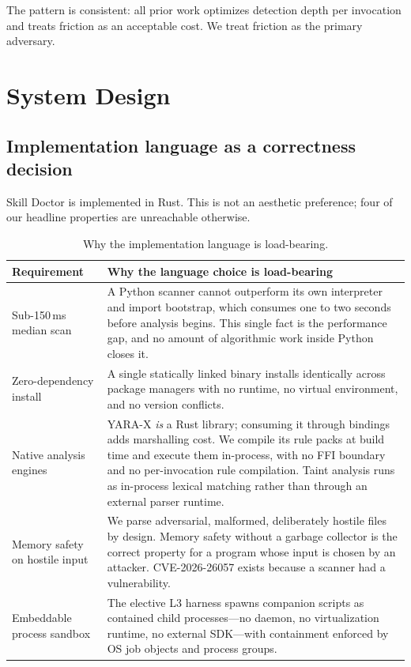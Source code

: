 \documentclass[11pt]{article}
\begin{document}
The pattern is consistent: all prior work optimizes detection depth per
invocation and treats friction as an acceptable cost. We treat friction as the
primary adversary.

\section{System Design}
\label{sec:design}

\subsection{Implementation language as a correctness decision}
\label{sec:rust}

Skill Doctor is implemented in Rust. This is not an aesthetic preference; four
of our headline properties are unreachable otherwise.

\begin{table}[htbp]
  \centering
  \caption{Why the implementation language is load-bearing.}
  \label{tab:rust}
  \small
  \begin{tabularx}{\textwidth}{p{}X}
    \toprule
    Requirement & Why the language choice is load-bearing \\
    \midrule
    Sub-150\,ms median scan &
    A Python scanner cannot outperform its own interpreter and import
    bootstrap, which consumes one to two seconds before analysis begins. This
    single fact is the performance gap, and no amount of algorithmic work
    inside Python closes it. \\
    Zero-dependency install &
    A single statically linked binary installs identically across package
    managers with no runtime, no virtual environment, and no version
    conflicts. \\
    Native analysis engines &
    YARA-X \emph{is} a Rust library; consuming it through bindings adds
    marshalling cost. We compile its rule packs at build time and execute them
    in-process, with no FFI boundary and no per-invocation rule compilation.
    Taint analysis runs as in-process lexical matching rather than through an
    external parser runtime. \\
    Memory safety on hostile input &
    We parse adversarial, malformed, deliberately hostile files by design.
    Memory safety without a garbage collector is the correct property for a
    program whose input is chosen by an attacker. CVE-2026-26057 exists because
    a scanner had a vulnerability. \\
    Embeddable process sandbox &
    The elective L3 harness spawns companion scripts as contained child
    processes---no daemon, no virtualization runtime, no external SDK---with
    containment enforced by OS job objects and process groups. \\
    \bottomrule
  \end{tabularx}
\end{table}
\end{document}
